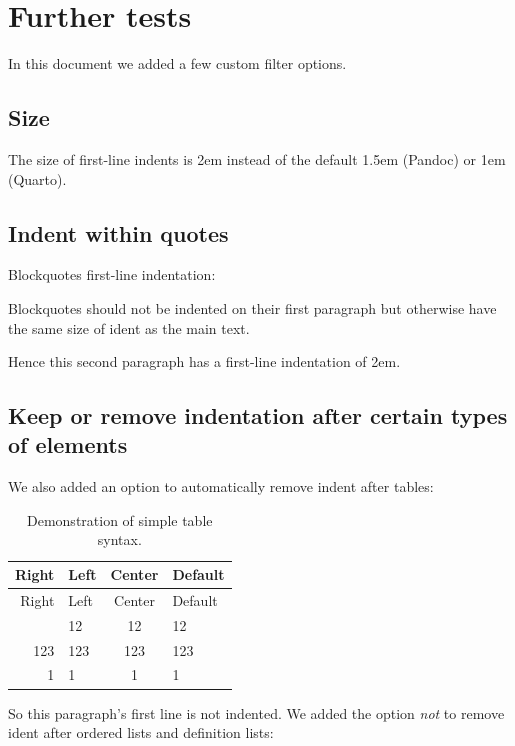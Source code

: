 \documentclass[
  letterpaper,
  DIV=11,
  numbers=noendperiod]{scrartcl}
\makeatletter
\renewenvironment{quote}
     {\list{}{\listparindent 1.5em%
              \itemindent \listparindent
              \rightmargin \leftmargin
              \parsep \z@ \@plus \p@}%
            \item\noindent\relax}
      {\endlist}
\makeatother
\begin{document}
\section{Further tests}\label{further-tests}

In this document we added a few custom filter options.

\subsection{Size}\label{size}

The size of first-line indents is 2em instead of the default 1.5em
(Pandoc) or 1em (Quarto).

\subsection{Indent within quotes}\label{indent-within-quotes}

Blockquotes first-line indentation:

\begin{quote}
\noindent Blockquotes should not be indented on their first paragraph
but otherwise have the same size of ident as the main text.

Hence this second paragraph has a first-line indentation of 2em.
\end{quote}

\subsection{Keep or remove indentation after certain types of
elements}\label{keep-or-remove-indentation-after-certain-types-of-elements}

We also added an option to automatically remove indent after tables:

\begin{longtable}[]{@{}rlcl@{}}
\caption{Demonstration of simple table syntax.}\tabularnewline
\toprule\noalign{}
Right & Left & Center & Default \\
\midrule\noalign{}
\endfirsthead
\toprule\noalign{}
Right & Left & Center & Default \\
\midrule\noalign{}
\endhead
\bottomrule\noalign{}
\endlastfoot
12 & 12 & 12 & 12 \\
123 & 123 & 123 & 123 \\
1 & 1 & 1 & 1 \\
\end{longtable}

\noindent So this paragraph's first line is not indented. We added the
option \emph{not} to remove ident after ordered lists and definition
lists:
\end{document}
